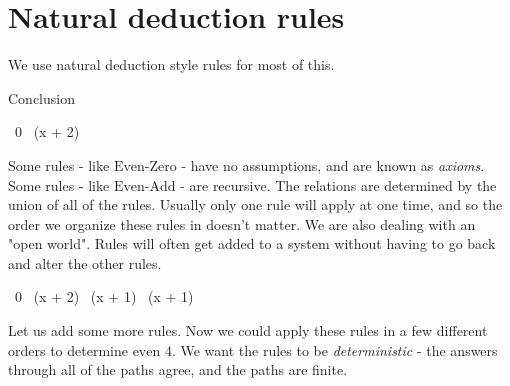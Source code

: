 
\section{Natural deduction rules}

\begin{frame}[c]
  We use natural deduction style rules for most of this.
\end{frame}

\begin{frame}
          {Conclusion}
\end{frame}

\begin{frame}[c]
  \begin{mdframed}[frametitle={Rules for evenness}]

          {~0}
          {~\left(x + 2\right)}
  \end{mdframed}

  \medskip

  \begin{overprint}
  \onslide<+>
  Some rules - like $\text{Even-Zero}$ - have no assumptions, and are known as {\it axioms}.
  \onslide<+>
  Some rules - like $\text{Even-Add}$ - are recursive.
  \onslide<+>
  The relations are determined by the union of all of the rules.
  \onslide<+>
  Usually only one rule will apply at one time, and so the order we organize these rules in doesn't matter.
  \onslide<+>
  We are also dealing with an "open world".
  \onslide<+>
  Rules will often get added to a system without having to go back and alter the other rules.
  \end{overprint}
\end{frame}

\begin{frame}[c]
  \begin{mdframed}[frametitle={Rules for evenness, now with bonus rules}]

          {~0}
          {~\left(x + 2\right)}
          {~\left(x + 1\right)}
          {~\left(x + 1\right)}
  \end{mdframed}

  \medskip

  \begin{overprint}
  \onslide<+>
  Let us add some more rules.
  \onslide<+>
  Now we could apply these rules in a few different orders to determine $\text{even 4}$.
  \onslide<+>
  We want the rules to be {\it deterministic} - the answers through all of the paths agree, and the paths are finite.
  \end{overprint}
\end{frame}

